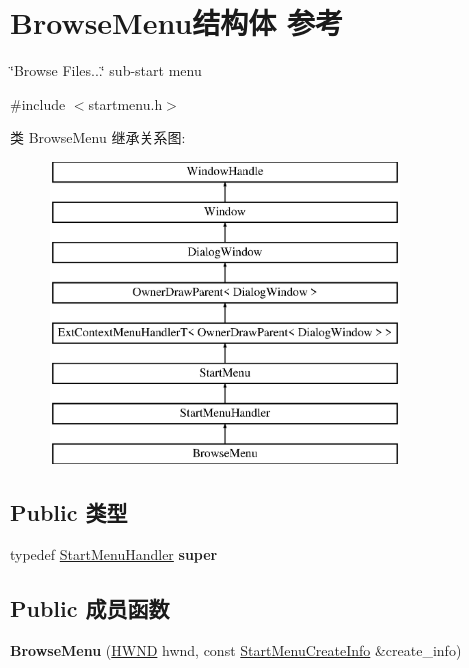 \hypertarget{struct_browse_menu}{}\section{Browse\+Menu结构体 参考}
\label{struct_browse_menu}


\char`\"{}\+Browse Files...\char`\"{} sub-\/start menu  




{\ttfamily \#include $<$startmenu.\+h$>$}

类 Browse\+Menu 继承关系图\+:\begin{figure}[H]
\begin{center}
\leavevmode
\includegraphics[height=8.000000cm]{struct_browse_menu}
\end{center}
\end{figure}
\subsection*{Public 类型}
\begin{DoxyCompactItemize}
\item 
\mbox{\label{struct_browse_menu_a1eac3b2595989f421ddeb6988666e9a0}} 
typedef \hyperlink{struct_start_menu_handler}{Start\+Menu\+Handler} {\bfseries super}
\end{DoxyCompactItemize}
\subsection*{Public 成员函数}
\begin{DoxyCompactItemize}
\item 
\mbox{\label{struct_browse_menu_a3493998f3d7c64acc0a2f8dba0cc63ef}} 
{\bfseries Browse\+Menu} (\hyperlink{interfacevoid}{H\+W\+ND} hwnd, const \hyperlink{struct_start_menu_create_info}{Start\+Menu\+Create\+Info} \&create\+\_\+info)
\end{DoxyCompactItemize}
